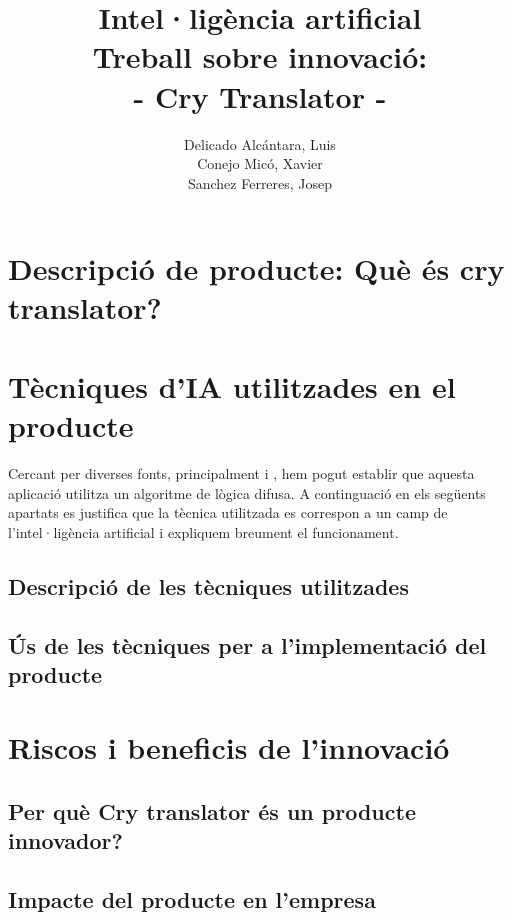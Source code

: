 \documentclass[11pt,a4paper]{article}
\author{
  Delicado Alcántara, Luis
  \\
  Conejo Micó, Xavier
  \\
  Sanchez Ferreres, Josep
}
\title{\Huge {Intel·ligència artificial}\\\medskip \huge{Treball sobre innovació:\\ - Cry Translator -}}
\begin{document}
\begin{titlepage}
\clearpage\maketitle
\thispagestyle{empty}
\end{titlepage}

\clearpage

\tableofcontents

\newpage

\section[\textsf{Què és Cry Translator?}]{\textsf{Descripció de producte: Què és cry translator?}}

\section{\textsf{Tècniques d'IA utilitzades en el producte}}

Cercant per diverses fonts, principalment \cite{patent} i \cite{elmundo}, hem pogut establir que aquesta aplicació utilitza un algoritme de lògica difusa. A continguació en els següents apartats es justifica que la tècnica utilitzada es correspon a un camp de l'intel·ligència artificial i expliquem breument el funcionament.

\subsection{\textsf{Descripció de les tècniques utilitzades}}



\subsection{\textsf{Ús de les tècniques per a l'implementació del producte}}

\section{\textsf{Riscos i beneficis de l'innovació}}

\subsection{\textsf{Per què Cry translator és un producte innovador?}}

\subsection{\textsf{Impacte del producte en l'empresa}}
\end{document}
